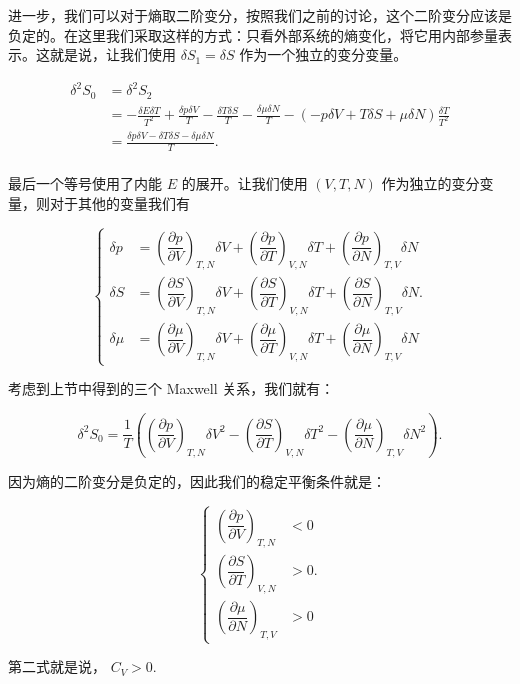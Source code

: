 进一步，我们可以对于熵取二阶变分，按照我们之前的讨论，这个二阶变分应该是负定的。在这里我们采取这样的方式：只看外部系统的熵变化，将它用内部参量表示。这就是说，让我们使用 $\delta S_1 = \delta S$ 作为一个独立的变分变量。
\begin{linenomath}\begin{equation}
\begin{aligned}
    \delta^2 S_0 &= \delta^2 S_2 \\ &= -\frac{\delta E\delta T}{T^2} + \frac{\delta p\delta V}{T} - \frac{\delta T\delta S}{T} - \frac{\delta\mu\delta N}{T} -\left( -p\delta V + T\delta S + \mu \delta N \right)\frac{\delta T}{T^2}\\
    &=  \frac{\delta p\delta V - \delta T\delta S - \delta\mu\delta N}{T}. \\
\end{aligned}
\end{equation}\end{linenomath}
最后一个等号使用了内能 $E$ 的展开。让我们使用 $(V,T,N)$ 作为独立的变分变量，则对于其他的变量我们有
\begin{linenomath}\begin{equation}
\begin{cases}
    \delta p &= \left( \dfrac{\partial p}{\partial V} \right)_{T,N} \delta V + \left(\dfrac{\partial p}{\partial T}\right)_{V,N} \delta T + \left( \dfrac{\partial p}{\partial N} \right)_{T,V} \delta N \\
    \delta S &= \left( \dfrac{\partial S}{\partial V} \right)_{T,N} \delta V + \left(\dfrac{\partial S}{\partial T}\right)_{V,N} \delta T + \left( \dfrac{\partial S}{\partial N} \right)_{T,V} \delta N. \\
    \delta \mu &= \left( \dfrac{\partial \mu}{\partial V} \right)_{T,N} \delta V + \left(\dfrac{\partial \mu}{\partial T}\right)_{V,N} \delta T + \left( \dfrac{\partial \mu}{\partial N} \right)_{T,V} \delta N
\end{cases}
\end{equation}\end{linenomath}
考虑到上节中得到的三个 Maxwell 关系，我们就有：
\begin{linenomath}\begin{equation}
\delta^2 S_0 = \frac1T\left( \left( \dfrac{\partial p}{\partial V} \right)_{T,N} \delta V^2 - \left(\dfrac{\partial S}{\partial T}\right)_{V,N} \delta T^2 - \left( \dfrac{\partial \mu}{\partial N} \right)_{T,V} \delta N^2 \right).
\end{equation}\end{linenomath}
因为熵的二阶变分是负定的，因此我们的稳定平衡条件就是：
\begin{linenomath}\begin{equation}
\begin{cases}
    \left( \dfrac{\partial p}{\partial V} \right)_{T,N} &< 0\\
    \left(\dfrac{\partial S}{\partial T}\right)_{V,N} &>0.\\
    \left( \dfrac{\partial \mu}{\partial N} \right)_{T,V} &>0
\end{cases}
\label{stab_cond}
\end{equation}\end{linenomath}
第二式就是说， $C_V>0.$

